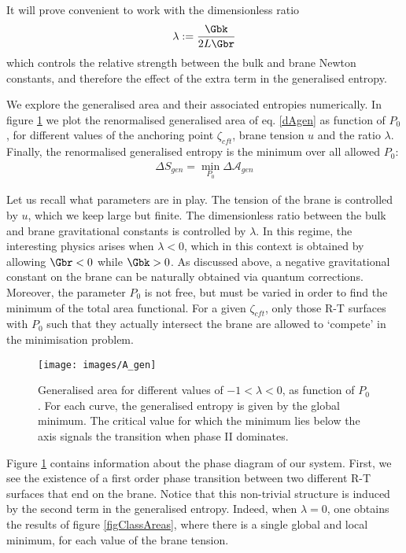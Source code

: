It will prove convenient to work with the dimensionless ratio
\begin{align}\label{lambdaratio}
\lambda:=\frac{\Gbk}{2L\Gbr}
\end{align}
which controls the relative strength between the bulk and brane Newton constants, and therefore the effect of the extra term in the generalised entropy.

We explore the generalised area and their associated entropies numerically. In figure \ref{figA_gen} we plot the renormalised generalised area of eq. \eqref{dAgen} as function of $P_0$, for different values of the anchoring point $\zeta_{cft}$, brane tension $u$ and the ratio $\lambda$.  Finally, the renormalised generalised entropy is the minimum over all allowed $P_0$:
\begin{align}\label{}
\Delta S_{gen}=\min_{P_0} \Delta \mathcal{A}_{gen}
\end{align}

Let us recall what parameters are in play. The tension of the brane is controlled by $u$, which we keep large but finite. The dimensionless ratio between the bulk and brane gravitational constants is controlled by $\lambda$. In this regime, the interesting physics arises when $\lambda<0$, which in this context is obtained by allowing $\Gbr<0$ while $\Gbk>0$.  As discussed above, a negative gravitational constant on the brane can be naturally obtained via quantum corrections. Moreover, the parameter $P_0$ is not free, but must be varied in order to find the minimum of the total area functional. For a given $\zeta_{cft}$, only those R-T surfaces with $P_0$ such that they actually intersect the brane are allowed to `compete' in the minimisation problem.
\begin{figure}[h]
\begin{center}
\texttt{[image: images/A\_gen]}
\caption{Generalised area for different values of $-1<\lambda<0$, as function of $P_0$. For each curve, the generalised entropy is given by the global minimum. The critical value for which the minimum lies below the axis signals the transition when phase II dominates.}
\label{figA_gen}
\end{center}
\end{figure}

Figure \ref{figA_gen} contains information about the phase diagram of our system. First, we see the existence of a first order phase transition between two different R-T surfaces that end on the brane. Notice that this non-trivial structure is induced by the second term in the generalised entropy. Indeed, when $\lambda=0$, one obtains the results of figure \ref{figClassAreas}, where there is a single global and local minimum, for each value of the brane tension.

